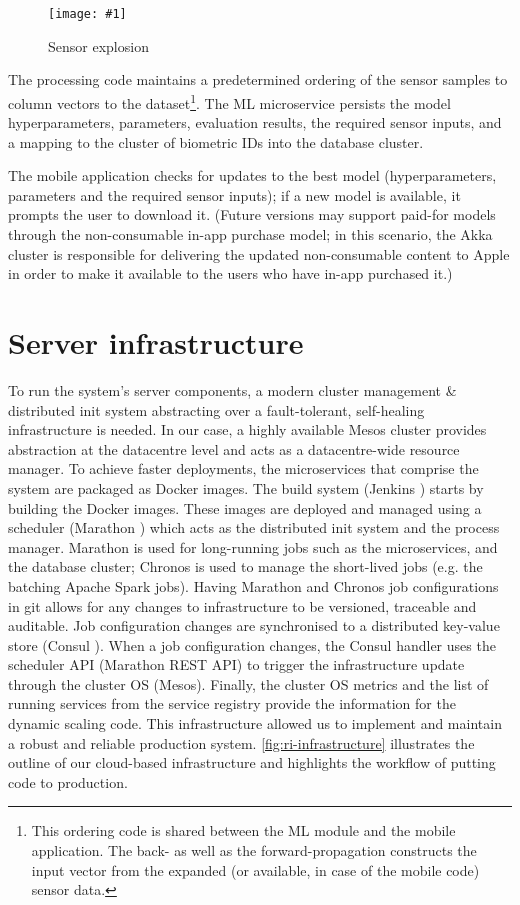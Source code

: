 \documentclass[a4paper, 10 pt, conference]{IEEEtran}
\newcommand{\fig}[3]{
  \begin{figure}[h]
    \begin{center}
        \caption{#3}
        \texttt{[image: \#1]}
        \label{fig:#2}
    \end{center}
  \end{figure}
}
\begin{document}
\fig{ri-sensor-explosion.png}{ri-sensor-explosion}{Sensor explosion}

The processing code maintains a predetermined ordering of the sensor samples to column vectors to the dataset\footnote{This ordering code is shared between the ML module and the mobile application. The back- as well as the forward-propagation constructs the input vector from the expanded (or available, in case of the mobile code) sensor data.}. The ML microservice persists the model hyperparameters, parameters, evaluation results, the required sensor inputs, and a mapping to the cluster of biometric IDs into the database cluster.

The mobile application checks for updates to the best model (hyperparameters, parameters and the required sensor inputs); if a new model is available, it prompts the user to download it. (Future versions may support paid-for models through the non-consumable in-app purchase model; in this scenario, the Akka cluster is responsible for delivering the updated non-consumable content to Apple in order to make it available to the users who have in-app purchased it.)

\section{Server infrastructure}

To run the system's server components, a modern cluster management \& distributed init system abstracting over a fault-tolerant, self-healing infrastructure is needed. In our case, a highly available Mesos \cite{mesos} cluster provides abstraction at the datacentre level and acts as a datacentre-wide resource manager. To achieve faster deployments, the microservices that comprise the system are packaged as Docker \cite{docker} images. The build system (Jenkins \cite{jenkins}) starts by building the Docker images. These images are deployed and managed using a scheduler (Marathon \cite{marathon}) which acts as the distributed init system and the process manager. Marathon is used for long-running jobs such as the microservices, and the database cluster; Chronos \cite{chronos} is used to manage the short-lived jobs (e.g. the batching Apache Spark jobs). Having Marathon and Chronos job configurations in git allows for any changes to infrastructure to be versioned, traceable and auditable. Job configuration changes are synchronised to a distributed key-value store (Consul \cite{consul}). When a job configuration changes, the Consul handler uses the scheduler API (Marathon REST API) to trigger the infrastructure update through the cluster OS (Mesos). Finally, the cluster OS metrics and the list of running services from the service registry provide the information for the dynamic scaling code.
This infrastructure allowed us to implement and maintain a robust and reliable production system. \autoref{fig:ri-infrastructure} illustrates the outline of our cloud-based infrastructure and highlights the workflow of putting code to production.
\end{document}

